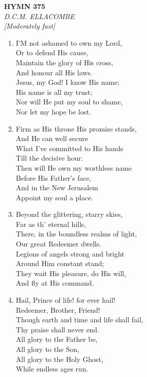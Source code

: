 \newpage
\begin{center}
    {\Large \textbf{HYMN 375}}
    \\
    \textit{D.C.M. ELLACOMBE}
    \\
    \textit{\small [Moderately fast]}
\end{center}
\vspace{1em}

\begin{enumerate}
    \item I'M not ashamed to own my Lord, \\
        Or to defend His cause, \\
        Maintain the glory of His cross, \\
        And honour all His laws. \\
        Jesus, my God! I know His name; \\
        His name is all my trust; \\
        Nor will He put my soul to shame, \\
        Nor let my hope be lost.

    \item Firm as His throne His promise stands, \\
        And He can well secure \\
        What I've committed to His hands \\
        Till the decisive hour. \\
        Then will He own my worthless name \\
        Before His Father's face, \\
        And in the New Jerusalem \\
        Appoint my soul a place.

    \item Beyond the glittering, starry skies, \\
        Far as th' eternal hills, \\
        There, in the boundless realms of light, \\
        Our great Redeemer dwells. \\
        Legions of angels strong and bright \\
        Around Him constant stand; \\
        They wait His pleasure, do His will, \\
        And fly at His command.

    \item Hail, Prince of life! for ever hail! \\
        Redeemer, Brother, Friend! \\
        Though earth and time and life shall fail, \\
        Thy praise shall never end. \\
        All glory to the Father be, \\
        All glory to the Son, \\
        All glory to the Holy Ghost, \\
        While endless ages run.

\end{enumerate}

